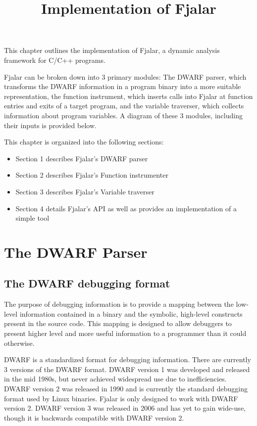 \documentclass[11pt]{article}
\title{Implementation of Fjalar}
\date{}
\author{}
\begin{document}
 \maketitle
This chapter outlines the implementation of Fjalar, a dynamic analysis
framework for C/C++ programs. 

Fjalar can be broken down into 3 primary modules: The DWARF parser,
which transforms the DWARF information in a program
binary into a more suitable representation, the function
instrument, which inserts calls into Fjalar at function entries and
exits of a target program, and the variable traverser, which
collects information about program variables. A diagram of these 3
modules, including their inputs is provided below.



This chapter is organized into the following sections: 

\begin{itemize}
\item Section 1 describes Fjalar's DWARF parser
\item Section 2 describes Fjalar's Function instrumenter
\item Section 3 describes Fjalar's Variable traverser
\item Section 4 details Fjalar's API as well as provides an
  implementation of a simple tool
\end{itemize}

\section{The DWARF Parser}
\subsection{The DWARF debugging format}
The purpose of debugging information is to provide a mapping between
the low-level information contained in a binary and the symbolic,
high-level constructs present in the source code. This mapping is
designed to allow debuggers to present higher level and more useful
information to a programmer than it could otherwise.

DWARF is a standardized format for debugging information. There are currently
3 versions of the DWARF format. DWARF version 1 was developed and
released in the mid 1980s, but never achieved widespread use due to
inefficiencies. DWARF version 2 was released in 1990 and is currently
the standard debugging format used by Linux binaries. Fjalar is
only designed to work with DWARF version 2. DWARF version 3 was
released in 2006 and has yet to gain wide-use, though it is backwards
compatible with DWARF version 2.
\end{document}

